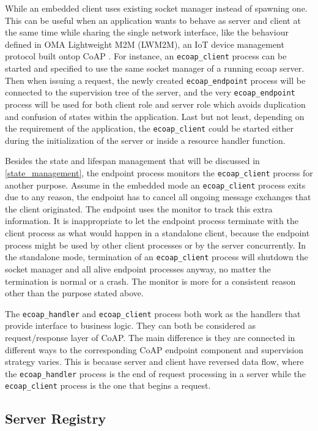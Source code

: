 While an embedded client uses existing socket manager instead of spawning one. This can be useful when an application wants to behave as server and client at the same time while sharing the single network interface, like the behaviour defined in OMA Lightweight M2M (LWM2M), an IoT device management protocol built ontop CoAP \autocite{lwm2m}. For instance, an \verb|ecoap_client| process can be started and specified to use the same socket manager of a running ecoap server. Then when issuing a request, the newly created \verb|ecoap_endpoint| process will be connected to the supervision tree of the server, and the very \verb|ecoap_endpoint| process will be used for both client role and server role which avoids duplication and confusion of states within the application. Last but not least, depending on the requirement of the application, the \verb|ecoap_client| could be started either during the initialization of the server or inside a resource handler function.

Besides the state and lifespan management that will be discussed in \autoref{state_management}, the endpoint process monitors the \verb|ecoap_client| process for another purpose. Assume in the embedded mode an \verb|ecoap_client| process exits due to any reason, the endpoint has to cancel all ongoing message exchanges that the client originated. The endpoint uses the monitor to track this extra information. It is inappropriate to let the endpoint process terminate with the client process as what would happen in a standalone client, because the endpoint process might be used by other client processes or by the server concurrently. In the standalone mode, termination of an \verb|ecoap_client| process will shutdown the socket manager and all alive endpoint processes anyway, no matter the termination is normal or a crash. The monitor is more for a consistent reason other than the purpose stated above.

The \verb|ecoap_handler| and \verb|ecoap_client| process both work as the handlers that provide interface to business logic. They can both be considered as request/response layer of CoAP. The main difference is they are connected in different ways to the corresponding CoAP endpoint component and supervision strategy varies. This is because server and client have reversed data flow, where the \verb|ecoap_handler| process is the end of request processing in a server while the \verb|ecoap_client| process is the one that begins a request.

\subsection{Server Registry}\label{coap_registry}

